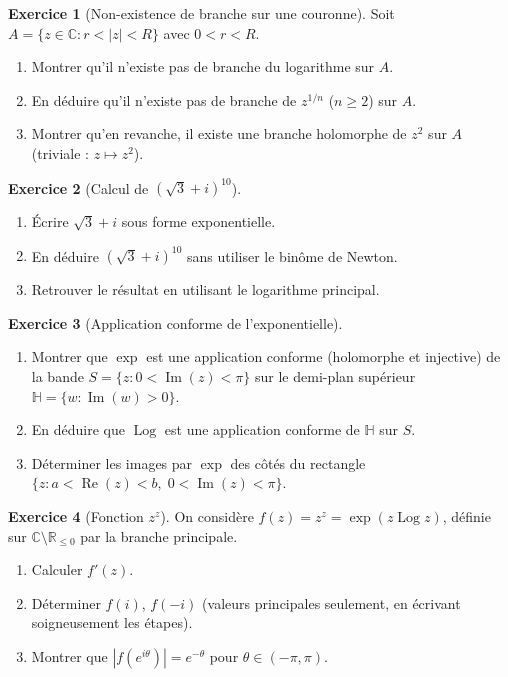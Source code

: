 \documentclass[12pt,a4paper,openany]{book}
\theoremstyle{definition}
\newtheorem{exercice}{Exercice}[chapter]
\theoremstyle{plain}
\theoremstyle{remark}
\newcommand{\C}{\mathbb{C}}
\newcommand{\R}{\mathbb{R}}
\DeclareMathOperator{\re}{Re}
\DeclareMathOperator{\im}{Im}
\DeclareMathOperator{\Log}{Log}
\newcommand{\abs}[1]{\left|#1\right|}
\begin{document}
\begin{exercice}[Non-existence de branche sur une couronne]\label{exo:branche-couronne}
Soit $A = \{z \in \C : r < \abs{z} < R\}$ avec $0 < r < R$.
\begin{enumerate}[label=(\alph*)]
  \item Montrer qu'il n'existe pas de branche du logarithme sur $A$.
  \item En déduire qu'il n'existe pas de branche de $z^{1/n}$ ($n \geq 2$) sur $A$.
  \item Montrer qu'en revanche, il existe une branche holomorphe de $z^2$ sur $A$ (triviale : $z \mapsto z^2$).
\end{enumerate}
\end{exercice}

\begin{exercice}[Calcul de $(\sqrt{3}+i)^{10}$]\label{exo:puissance-entiere}
\begin{enumerate}[label=(\alph*)]
  \item Écrire $\sqrt{3}+i$ sous forme exponentielle.
  \item En déduire $(\sqrt{3}+i)^{10}$ sans utiliser le binôme de Newton.
  \item Retrouver le résultat en utilisant le logarithme principal.
\end{enumerate}
\end{exercice}

\begin{exercice}[Application conforme de l'exponentielle]\label{exo:conforme-exp}
\begin{enumerate}[label=(\alph*)]
  \item Montrer que $\exp$ est une application conforme (holomorphe et injective) de la bande $S = \{z : 0 < \im(z) < \pi\}$ sur le demi-plan supérieur $\mathbb{H} = \{w : \im(w) > 0\}$.
  \item En déduire que $\Log$ est une application conforme de $\mathbb{H}$ sur $S$.
  \item Déterminer les images par $\exp$ des côtés du rectangle $\{z : a < \re(z) < b,\; 0 < \im(z) < \pi\}$.
\end{enumerate}
\end{exercice}

\begin{exercice}[Fonction $z^z$]\label{exo:z-puissance-z}
On considère $f(z) = z^z = \exp(z\Log z)$, définie sur $\C \setminus \R_{\leq 0}$ par la branche principale.
\begin{enumerate}[label=(\alph*)]
  \item Calculer $f'(z)$.
  \item Déterminer $f(i)$, $f(-i)$ (valeurs principales seulement, en écrivant soigneusement les étapes).
  \item Montrer que $\abs{f(e^{i\theta})} = e^{-\theta}$ pour $\theta \in (-\pi,\pi)$.
\end{enumerate}
\end{exercice}
\end{document}

